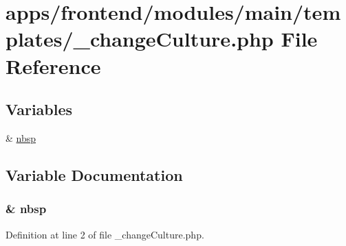 \hypertarget{frontend_2modules_2main_2templates_2__change_culture_8php}{\section{apps/frontend/modules/main/templates/\-\_\-change\-Culture.php File Reference}
\label{frontend_2modules_2main_2templates_2__change_culture_8php}
}
\subsection*{Variables}
\begin{DoxyCompactItemize}
\item 
\& \hyperlink{frontend_2modules_2main_2templates_2__change_culture_8php_aef915316f784c9063d942974538301a6}{nbsp}
\end{DoxyCompactItemize}


\subsection{Variable Documentation}
\hypertarget{frontend_2modules_2main_2templates_2__change_culture_8php_aef915316f784c9063d942974538301a6}{
\subsubsection[{nbsp}]{\setlength{\rightskip}{0pt plus 5cm}\& nbsp}}\label{frontend_2modules_2main_2templates_2__change_culture_8php_aef915316f784c9063d942974538301a6}


Definition at line 2 of file \-\_\-change\-Culture.\-php.

